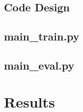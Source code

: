 \subsection{Code Design}

%


\subsection{main\_train.py}



\subsection{main\_eval.py}





\section{Results}



